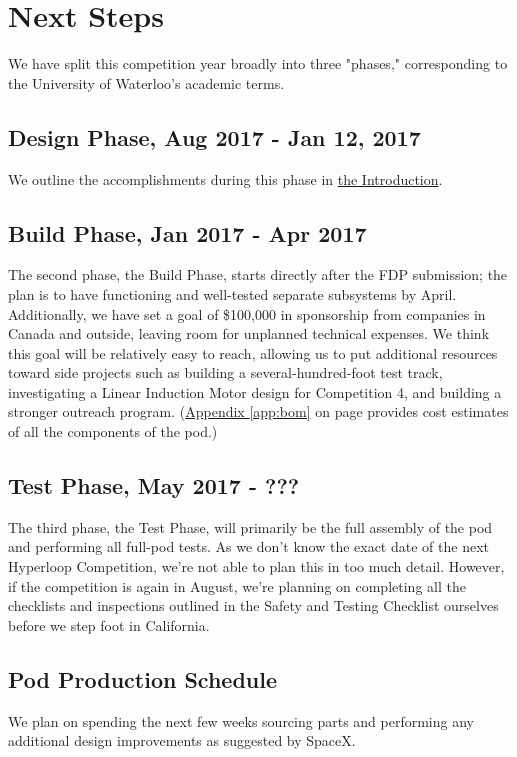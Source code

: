 \documentclass[main.tex]{subfiles}
\begin{document}
    \chapter{Next Steps}
    \label{ch:next-steps}
    We have split this competition year broadly into three "phases," corresponding to the University of Waterloo's academic terms.
    
    \section{Design Phase, Aug 2017 - Jan 12, 2017}
    We outline the accomplishments during this phase in \hyperref[ch:intro]{the Introduction}.
    
    \section{Build Phase, Jan 2017 - Apr 2017}
    The second phase, the Build Phase, starts directly after the FDP submission; the plan is to have functioning and well-tested separate subsystems by April. Additionally, we have set a goal of \$100,000 in sponsorship from companies in Canada and outside, leaving room for unplanned technical expenses. We think this goal will be relatively easy to reach, allowing us to put additional resources toward side projects such as building a several-hundred-foot test track, investigating a Linear Induction Motor design for Competition 4, and building a stronger outreach program. (\hyperref[app:bom]{Appendix \ref{app:bom}} on page \pageref{app:bom} provides cost estimates of all the components of the pod.)
    
	\section{Test Phase, May 2017 - ???}
    The third phase, the Test Phase, will primarily be the full assembly of the pod and performing all full-pod tests. As we don't know the exact date of the next Hyperloop Competition, we're not able to plan this in too much detail. However, if the competition is again in August, we're planning on completing all the checklists and inspections outlined in the Safety and Testing Checklist ourselves before we step foot in California.
    
    \section{Pod Production Schedule}
    We plan on spending the next few weeks sourcing parts and performing any additional design improvements as suggested by SpaceX.
    
\end{document}
